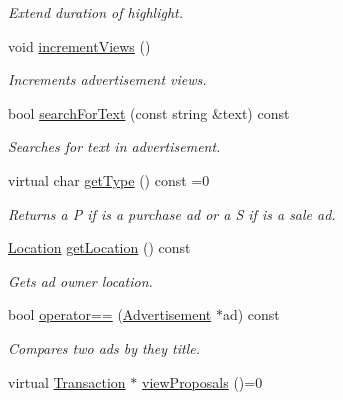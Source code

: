 \begin{DoxyCompactItemize}
\begin{DoxyCompactList}\small\item\em Extend duration of highlight. \end{DoxyCompactList}\item 
\hypertarget{class_advertisement_abd20373813b956bac9a6fd78a4947ebc}{}void \hyperlink{class_advertisement_abd20373813b956bac9a6fd78a4947ebc}{increment\+Views} ()\label{class_advertisement_abd20373813b956bac9a6fd78a4947ebc}

\begin{DoxyCompactList}\small\item\em Increments advertisement views. \end{DoxyCompactList}\item 
bool \hyperlink{class_advertisement_a0a6b830d332effa0fd4a0263a2d477bf}{search\+For\+Text} (const string \&text) const 
\begin{DoxyCompactList}\small\item\em Searches for text in advertisement. \end{DoxyCompactList}\item 
virtual char \hyperlink{class_advertisement_acb3174a830215ed6dfd922002f2c8924}{get\+Type} () const  =0
\begin{DoxyCompactList}\small\item\em Returns a P if is a purchase ad or a S if is a sale ad. \end{DoxyCompactList}\item 
\hyperlink{class_location}{Location} \hyperlink{class_advertisement_a353ac42132683f145b64cf00cd9bdf40}{get\+Location} () const 
\begin{DoxyCompactList}\small\item\em Gets ad owner location. \end{DoxyCompactList}\item 
bool \hyperlink{class_advertisement_a72e7b7fe8f2d1070fa2682d268e39567}{operator==} (\hyperlink{class_advertisement}{Advertisement} $\ast$ad) const 
\begin{DoxyCompactList}\small\item\em Compares two ads by they title. \end{DoxyCompactList}\item 
\hypertarget{class_advertisement_a18c7ef25ce6c2013ad50f2ace77e6596}{}virtual \hyperlink{class_transaction}{Transaction} $\ast$ \hyperlink{class_advertisement_a18c7ef25ce6c2013ad50f2ace77e6596}{view\+Proposals} ()=0\label{class_advertisement_a18c7ef25ce6c2013ad50f2ace77e6596}


\end{DoxyCompactItemize}
